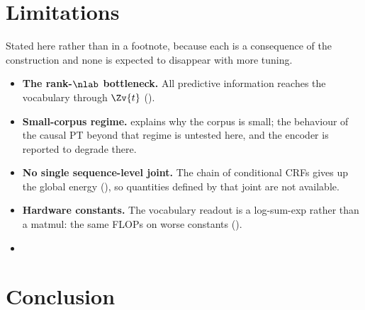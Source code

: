 \section{Limitations}
\label{sec:limitations}

Stated here rather than in a footnote, because each is a consequence of the construction and
none is expected to disappear with more tuning.

\begin{itemize}
  \item \textbf{The rank-$\nlab$ bottleneck.} All predictive information reaches the vocabulary
        through $\Zv{t}$ ().
  \item \textbf{Small-corpus regime.}  explains why the corpus is small; the
        behaviour of the causal PT beyond that regime is untested here, and the encoder is
        reported to degrade there.
  \item \textbf{No single sequence-level joint.} The chain of conditional CRFs gives up the
        global energy (), so quantities defined by that joint are not
        available.
  \item \textbf{Hardware constants.} The vocabulary readout is a log-sum-exp rather than a
        matmul: the same FLOPs on worse constants ().
  \item {}
\end{itemize}

\section{Conclusion}
\label{sec:conclusion}

